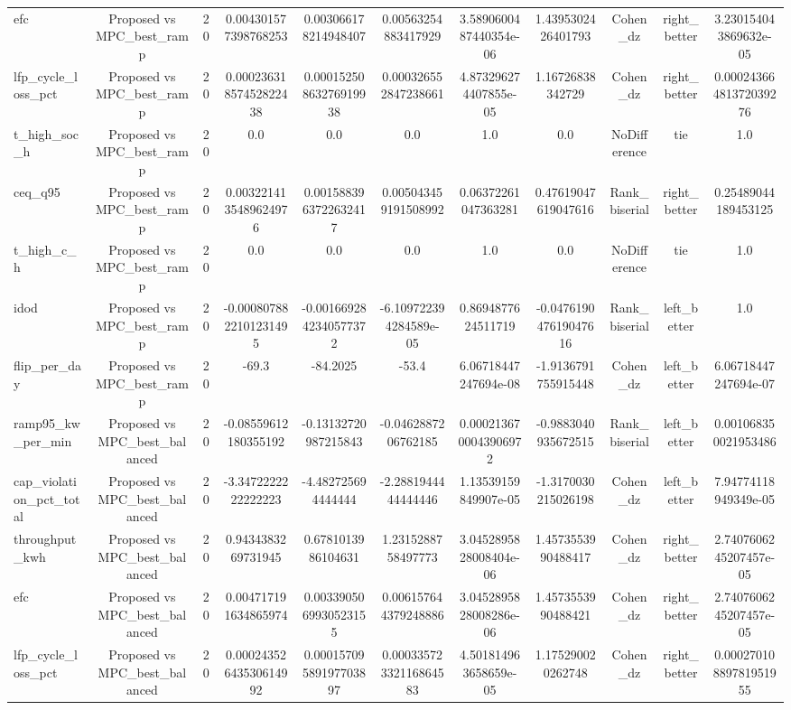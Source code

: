 \begin{table}[t]
\begin{tabular}{lcccccccccc}
efc & Proposed vs MPC\_best\_ramp & 20 & 0.004301577398768253 & 0.003066178214948407 & 0.00563254883417929 & 3.5890600487440354e-06 & 1.4395302426401793 & Cohen\_dz & right\_better & 3.230154043869632e-05 \\
lfp\_cycle\_loss\_pct & Proposed vs MPC\_best\_ramp & 20 & 0.00023631857452822438 & 0.00015250863276919938 & 0.000326552847238661 & 4.873296274407855e-05 & 1.16726838342729 & Cohen\_dz & right\_better & 0.00024366481372039276 \\
t\_high\_soc\_h & Proposed vs MPC\_best\_ramp & 20 & 0.0 & 0.0 & 0.0 & 1.0 & 0.0 & NoDifference & tie & 1.0 \\
ceq\_q95 & Proposed vs MPC\_best\_ramp & 20 & 0.0032214135489624976 & 0.0015883963722632417 & 0.005043459191508992 & 0.06372261047363281 & 0.47619047619047616 & Rank\_biserial & right\_better & 0.25489044189453125 \\
t\_high\_c\_h & Proposed vs MPC\_best\_ramp & 20 & 0.0 & 0.0 & 0.0 & 1.0 & 0.0 & NoDifference & tie & 1.0 \\
idod & Proposed vs MPC\_best\_ramp & 20 & -0.0008078822101231495 & -0.0016692842340577372 & -6.109722394284589e-05 & 0.8694877624511719 & -0.047619047619047616 & Rank\_biserial & left\_better & 1.0 \\
flip\_per\_day & Proposed vs MPC\_best\_ramp & 20 & -69.3 & -84.2025 & -53.4 & 6.06718447247694e-08 & -1.9136791755915448 & Cohen\_dz & left\_better & 6.06718447247694e-07 \\
ramp95\_kw\_per\_min & Proposed vs MPC\_best\_balanced & 20 & -0.08559612180355192 & -0.13132720987215843 & -0.0462887206762185 & 0.0002136700043906972 & -0.9883040935672515 & Rank\_biserial & left\_better & 0.001068350021953486 \\
cap\_violation\_pct\_total & Proposed vs MPC\_best\_balanced & 20 & -3.3472222222222223 & -4.482725694444444 & -2.2881944444444446 & 1.13539159849907e-05 & -1.3170030215026198 & Cohen\_dz & left\_better & 7.94774118949349e-05 \\
throughput\_kwh & Proposed vs MPC\_best\_balanced & 20 & 0.9434383269731945 & 0.6781013986104631 & 1.2315288758497773 & 3.0452895828008404e-06 & 1.4573553990488417 & Cohen\_dz & right\_better & 2.7407606245207457e-05 \\
efc & Proposed vs MPC\_best\_balanced & 20 & 0.004717191634865974 & 0.0033905069930523155 & 0.006157644379248886 & 3.0452895828008286e-06 & 1.4573553990488421 & Cohen\_dz & right\_better & 2.7407606245207457e-05 \\
lfp\_cycle\_loss\_pct & Proposed vs MPC\_best\_balanced & 20 & 0.00024352643530614992 & 0.00015709589197703897 & 0.00033572332116864583 & 4.501814963658659e-05 & 1.175290020262748 & Cohen\_dz & right\_better & 0.00027010889781951955 \\

\end{tabular}
\end{table}

